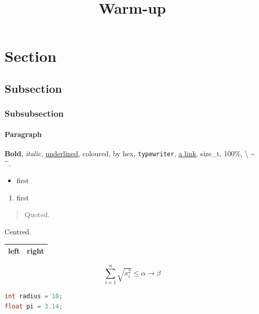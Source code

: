 \documentclass[11pt]{article}
\title{Warm-up}
\author{}
\date{}
\begin{document}
\maketitle

\section{Section}
\subsection{Subsection}
\subsubsection{Subsubsection}
\paragraph{Paragraph}
\textbf{Bold}, \textit{italic}, \underline{underlined},
\textcolor{warm}{coloured}, \textcolor[HTML]{529CCA}{by hex},
\texttt{typewriter}, \href{https://example.com}{a link}, size\_t, 100\%,
\textbackslash{} \textasciitilde{} \textasciicircum{}.

\begin{itemize}
    \item first
\end{itemize}

\begin{enumerate}
    \item first
\end{enumerate}

\begin{quote}
    Quoted.
\end{quote}

\begin{center}
    Centred.
\end{center}

\begin{tabular}{|l|r|}
    \hline
    left & right \\
    \hline
\end{tabular}

\[
    \sum_{i=1}^{n} \sqrt{x_i^{2}} \leq \alpha \to \beta
\]

\begin{lstlisting}[language=C]
int radius = 10;
float pi = 3.14;
\end{lstlisting}
\end{document}

